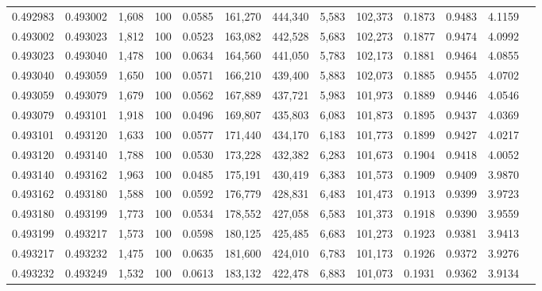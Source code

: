 \begin{tabular}{rrrrrrrrrrrrr}
0.492983 & 0.493002 & 1,608 & 100 &                                     0.0585 & 161,270 & 444,340 &   5,583 & 102,373 & 0.1873 & 0.9483 & 4.1159 \\
0.493002 & 0.493023 & 1,812 & 100 &                                     0.0523 & 163,082 & 442,528 &   5,683 & 102,273 & 0.1877 & 0.9474 & 4.0992 \\
0.493023 & 0.493040 & 1,478 & 100 &                                     0.0634 & 164,560 & 441,050 &   5,783 & 102,173 & 0.1881 & 0.9464 & 4.0855 \\
0.493040 & 0.493059 & 1,650 & 100 &                                     0.0571 & 166,210 & 439,400 &   5,883 & 102,073 & 0.1885 & 0.9455 & 4.0702 \\
0.493059 & 0.493079 & 1,679 & 100 &                                     0.0562 & 167,889 & 437,721 &   5,983 & 101,973 & 0.1889 & 0.9446 & 4.0546 \\
0.493079 & 0.493101 & 1,918 & 100 &                                     0.0496 & 169,807 & 435,803 &   6,083 & 101,873 & 0.1895 & 0.9437 & 4.0369 \\
0.493101 & 0.493120 & 1,633 & 100 &                                     0.0577 & 171,440 & 434,170 &   6,183 & 101,773 & 0.1899 & 0.9427 & 4.0217 \\
0.493120 & 0.493140 & 1,788 & 100 &                                     0.0530 & 173,228 & 432,382 &   6,283 & 101,673 & 0.1904 & 0.9418 & 4.0052 \\
0.493140 & 0.493162 & 1,963 & 100 &                                     0.0485 & 175,191 & 430,419 &   6,383 & 101,573 & 0.1909 & 0.9409 & 3.9870 \\
0.493162 & 0.493180 & 1,588 & 100 &                                     0.0592 & 176,779 & 428,831 &   6,483 & 101,473 & 0.1913 & 0.9399 & 3.9723 \\
0.493180 & 0.493199 & 1,773 & 100 &                                     0.0534 & 178,552 & 427,058 &   6,583 & 101,373 & 0.1918 & 0.9390 & 3.9559 \\
0.493199 & 0.493217 & 1,573 & 100 &                                     0.0598 & 180,125 & 425,485 &   6,683 & 101,273 & 0.1923 & 0.9381 & 3.9413 \\
0.493217 & 0.493232 & 1,475 & 100 &                                     0.0635 & 181,600 & 424,010 &   6,783 & 101,173 & 0.1926 & 0.9372 & 3.9276 \\
0.493232 & 0.493249 & 1,532 & 100 &                                     0.0613 & 183,132 & 422,478 &   6,883 & 101,073 & 0.1931 & 0.9362 & 3.9134 \\

\end{tabular}
